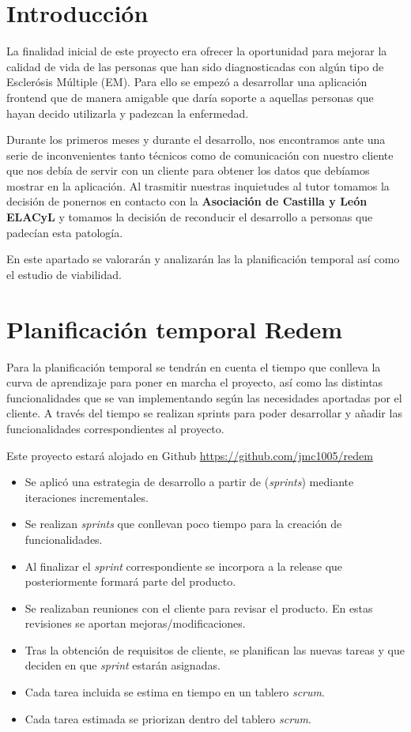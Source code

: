 
\section{Introducción}
La finalidad inicial de este proyecto era ofrecer la oportunidad para mejorar la calidad de vida de las personas que han sido diagnosticadas con algún tipo de Esclerósis Múltiple (EM). Para ello se empezó a desarrollar una aplicación frontend que de manera amigable que daría soporte a aquellas personas que hayan decido utilizarla y padezcan la enfermedad.

Durante los primeros meses y durante el desarrollo, nos encontramos ante una serie de inconvenientes tanto técnicos como de comunicación con nuestro cliente que nos debía de servir con un cliente para obtener los datos que debíamos mostrar en la aplicación. Al trasmitir nuestras inquietudes al tutor {\nomtutor} tomamos la decisión de ponernos en contacto con la \textbf{Asociación de Castilla y León ELACyL} y tomamos la decisión de reconducir el desarrollo a personas que padecían esta patología.

En este apartado se valorarán y analizarán las la planificación temporal así como el estudio de viabilidad.

\section{Planificación temporal Redem}
Para la planificación temporal se tendrán en cuenta el tiempo que conlleva la curva de aprendizaje para poner en marcha el proyecto, así como las distintas funcionalidades que se van implementando según las necesidades aportadas por el cliente.
A través del tiempo se realizan sprints para poder desarrollar y añadir las funcionalidades correspondientes al proyecto.

Este proyecto estará alojado en Github \url{https://github.com/jmc1005/redem}

\begin{itemize}
\tightlist
\item Se aplicó una estrategia de desarrollo a partir de (\emph{sprints}) mediante iteraciones incrementales.
\item Se realizan \emph{sprints} que conllevan poco tiempo para la creación de funcionalidades.
\item Al finalizar el \emph{sprint} correspondiente se incorpora a la release que posteriormente formará parte del producto.
\item Se realizaban reuniones con el cliente para revisar el producto. En estas revisiones se aportan mejoras/modificaciones.
\item Tras la obtención de requisitos de cliente, se planifican las nuevas tareas y que deciden en que \emph{sprint} estarán asignadas.
\item Cada tarea incluida se estima en tiempo en un tablero \emph{scrum}.
\item Cada tarea estimada se priorizan dentro del tablero \emph{scrum}.
\end{itemize}

